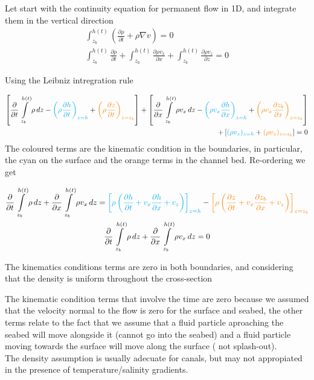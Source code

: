 \documentclass[a4paper, 11pt,article,oneside]{memoir}%
\begin{document}
Let start with the continuity equation for permanent flow in 1D, and integrate them in the vertical direction
\begin{gather*}
\int_{z_b}^{h(t)}\left(\frac{\partial \rho}{\partial t}+\rho \nabla v\right)=0 \\
\int _{z_b}^{h(t)}\frac{\partial \rho}{\partial t}+\int_{z_b}^{h(t)}\frac{\partial \rho v_x}{\partial x}+\int_{z_b}^{h(t)}\frac{\partial \rho v_z}{\partial z}=0
\end{gather*}


Using the Leibniz intregration rule

\begin{align*}
\left[\frac{\partial}{\partial t} \int\limits _{z_b}^{h(t)} \rho\, dz - {\color{cyan}\left(\rho \frac{\partial h}{\partial t}\right)_{z=h}}+{\color{orange}\left( \rho \frac{\partial z}{\partial t}\right)_{z=z_b}}\right]+
 \left[\frac{\partial}{\partial x}\int\limits_{z_b}^{h(t)} \rho v_x \,dz- {\color{cyan}\left(\rho v_x \frac{\partial h}{\partial x}\right)_{z=h}}+{\color{orange}\left( \rho v_x \frac{\partial z_b}{\partial x}\right)_{z=z_b}} \right]\\
 +\left[{\color{cyan} (\rho v_z)_{z=h}}+{\color{orange} (\rho v_z)_{z=z_b}}\right]=0
\end{align*}
The coloured terms are the kinematic condition in the  boundaries, in particular, the {\color{cyan}cyan} on the surface and the {\color{orange} orange } terms  in the channel bed.
Re-ordering we get 
\begin{eqbox}
\begin{gather*}
\frac{\partial}{\partial t} \int\limits _{z_b}^{h(t)} \rho\, dz+\frac{\partial}{\partial x}\int\limits_{z_b}^{h(t)} \rho v_x \,dz= 
 {\color{cyan}\left[\rho\left( \frac{\partial h}{\partial t}+ v_x \frac{\partial h}{\partial x}+ v_z\right)\right]_{z=h}}
-
{\color{orange}\left[\rho\left(\frac{\partial z}{\partial t}+ v_x \frac{\partial z_b}{\partial x}+ v_z\right)\right]_{z=z_b} }\\
\frac{\partial}{\partial t} \int\limits _{z_b}^{h(t)} \rho\, dz+\frac{\partial}{\partial x}\int\limits_{z_b}^{h(t)} \rho v_x \,dz= 0
\end{gather*}
\end{eqbox}
The kinematics conditions terms are zero in both boundaries, and considering that the density is uniform throughout the cross-section 
\begin{note}
The kinematic condition terms that involve the time are zero because we assumed that the velocity normal to the flow is zero for the surface and seabed, the other terms relate to the fact that we assume that  a fluid particle aproaching the seabed will move alongside it (cannot go into the seabed) and a fluid particle moving towards the surface will move along the surface ( not splash-out). \\
The density assumption is usually adecuate for canals, but may not appropiated in the presence of temperature/salinity gradients.
\end{note}
\end{document}
